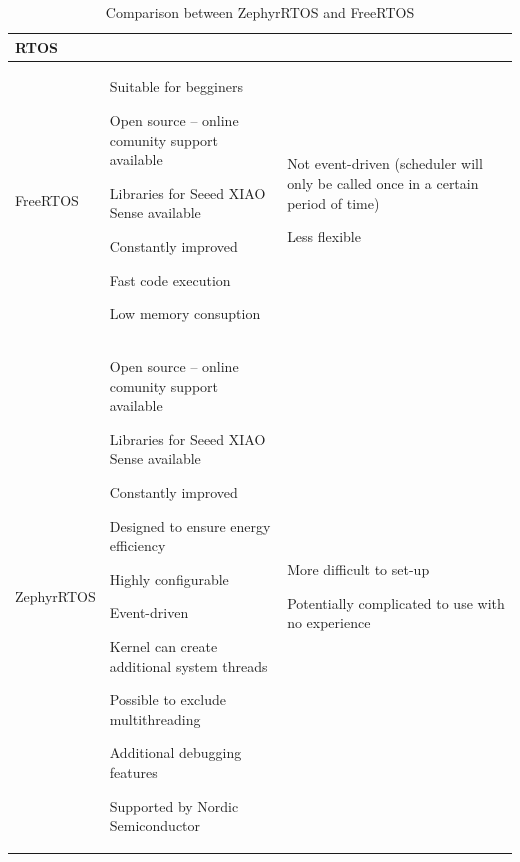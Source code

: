 \begin{table}[H]
      \makegapedcells
      \setlength{\tabcolsep}{3pt}
  \begin{tabularx}{\linewidth}{|>{\RaggedRight}p{25mm}|*{2}{I |}}
      \hline
  RTOS
      &       &           \\
      \hline
  FreeRTOS 
      &   \item Suitable for begginers
          \item Open source – online comunity support available 
          \item Libraries for Seeed XIAO Sense available
          \item Constantly improved
          \item Fast code execution
          \item Low memory consuption
          &   \item Not event-driven (scheduler will only be called once in a certain period of time)
              \item Less flexible
              \\
      \hline
  ZephyrRTOS
      &   \item Open source – online comunity support available
          \item Libraries for Seeed XIAO Sense available
          \item Constantly improved
          \item Designed to ensure energy efficiency
          \item Highly configurable
          \item Event-driven
          \item Kernel can create additional system threads
          \item Possible to exclude multithreading
          \item Additional debugging features
          \item Supported by Nordic Semiconductor
          &   \item More difficult to set-up
              \item Potentially complicated to use with no experience
              \\
      \hline

\end{tabularx}
\caption{Comparison between ZephyrRTOS and FreeRTOS}
\label{table.rtos}
\end{table}

